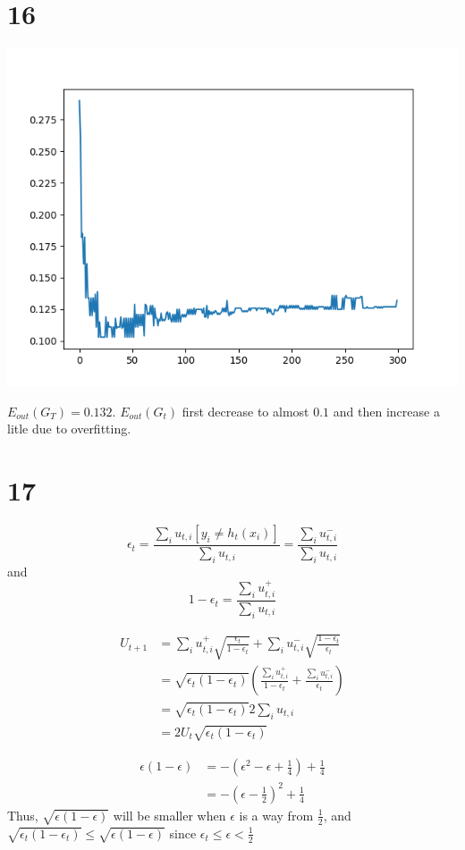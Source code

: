 \documentclass[12pt]{article}
\begin{document}
\section*{16}
\begin{center}
    \includegraphics[scale=0.5]{p16.png}
\end{center}
$E_{out}(G_T) = 0.132$. $E_{out}(G_t)$ first decrease to almost $0.1$ 
and then increase a litle due to overfitting.

\section*{17}
\[
    \epsilon_t = \frac{\sum_i u_{t, i} [y_i \neq h_t(x_i)]}{\sum_i u_{t, i}}
    =  \frac{\sum_i u_{t, i}^-}{\sum_i u_{t, i}}
\]
and 
\[
    1 - \epsilon_t = \frac{\sum_i u_{t, i}^+}{\sum_i u_{t, i}}
\]

\begin{equation*}
    \begin{split}
        U_{t+1} &= \sum_i u_{t, i}^+ \sqrt{\frac{\epsilon_t}{1-\epsilon_t}} + \sum_i u_{t, i}^- \sqrt{\frac{1-\epsilon_t}{\epsilon_t}} \\
        &= \sqrt{\epsilon_t(1-\epsilon_t)} (\frac{\sum_i u_{t,i}^+}{1-\epsilon_t} + \frac{\sum_i u_{t,i}^-}{\epsilon_t}) \\
        &= \sqrt{\epsilon_t(1-\epsilon_t)} 2 \sum_i u_{t, i} \\
        &= 2 U_t \sqrt{\epsilon_t(1-\epsilon_t)}
    \end{split}
\end{equation*}

\begin{equation*}
    \begin{split}
        \epsilon (1 - \epsilon) &= - (\epsilon^2 - \epsilon + \frac{1}{4}) + \frac{1}{4} \\
        &= -(\epsilon - \frac{1}{2})^2 + \frac{1}{4}
    \end{split}
\end{equation*}
Thus, $\sqrt{\epsilon(1-\epsilon)}$ will be smaller when $\epsilon$ is a way from $\frac{1}{2}$,
and $\sqrt{\epsilon_t(1-\epsilon_t)} \leq \sqrt{\epsilon(1-\epsilon)}$ since
$\epsilon_t \leq \epsilon < \frac{1}{2}$
\end{document}
